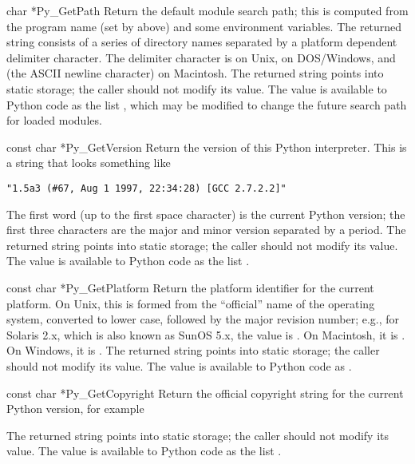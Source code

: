 \begin{cfuncdesc}{char *}{Py_GetPath}{}
Return the default module search path; this is computed from the 
program name (set by  above) and some 
environment variables.  The returned string consists of a series of 
directory names separated by a platform dependent delimiter character.  
The delimiter character is  on Unix,  on 
DOS/Windows, and  (the ASCII newline character) on 
Macintosh.  The returned string points into static storage; the caller 
should not modify its value.  The value is available to Python code 
as the list , which may be modified to change the 
future search path for loaded modules.

\end{cfuncdesc}

\begin{cfuncdesc}{const char *}{Py_GetVersion}{}
Return the version of this Python interpreter.  This is a string that 
looks something like

\begin{verbatim}
"1.5a3 (#67, Aug 1 1997, 22:34:28) [GCC 2.7.2.2]"
\end{verbatim}

The first word (up to the first space character) is the current Python 
version; the first three characters are the major and minor version 
separated by a period.  The returned string points into static storage; 
the caller should not modify its value.  The value is available to 
Python code as the list .
\end{cfuncdesc}

\begin{cfuncdesc}{const char *}{Py_GetPlatform}{}
Return the platform identifier for the current platform.  On Unix, 
this is formed from the ``official'' name of the operating system, 
converted to lower case, followed by the major revision number; e.g., 
for Solaris 2.x, which is also known as SunOS 5.x, the value is 
.  On Macintosh, it is .  On Windows, it 
is .  The returned string points into static storage; 
the caller should not modify its value.  The value is available to 
Python code as .
\end{cfuncdesc}

\begin{cfuncdesc}{const char *}{Py_GetCopyright}{}
Return the official copyright string for the current Python version, 
for example


The returned string points into static storage; the caller should not 
modify its value.  The value is available to Python code as the list 
.
\end{cfuncdesc}

